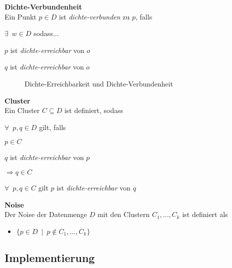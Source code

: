 \documentclass{lni}
\newcommand{\SubItem}[1]{
    {\setlength\itemindent{15pt} \item[-] #1}
}
\begin{document}

\textbf{Dichte-Verbundenheit}\\

Ein Punkt $ p \in D $ ist \textit{dichte-verbunden} zu $p$, falls
\begin{itemize}
    \item $\exists\enspace w \in D$ sodass...
        \SubItem{ $p$ ist \textit{dichte-erreichbar} von $o$}
        \SubItem{ $q$ ist \textit{dichte-erreichbar} von $o$}
\end{itemize}


\begin{figure}[hb]
    \centering
    \subfloat[]{{}}%
    \qquad
    \subfloat[]{{}}
    \caption{Dichte-Erreichbarkeit und Dichte-Verbundenheit}%
    \label{fig:2}%
\end{figure}

    
\textbf{Cluster}\\
Ein Cluster $ C \subseteq D $ ist definiert, sodass
\begin{itemize}
    \item $\forall\enspace p,q \in D$ gilt, falls
        \SubItem{$p \in C$}
        \SubItem{$q$ ist \textit{dichte-erreichbar} von $p$}
        
    $\Rightarrow q \in C$
    
    \item $\forall\enspace p,q \in C$ gilt $p$ ist \textit{dichte-erreichbar} von $q$
\end{itemize}

    
\textbf{Noise}\\
Der Noise der Datenmenge $D$ mit den Clustern $C_1,\dots,C_k$ ist definiert als
\begin{itemize}
    \item $ \{ p \in D \enspace | \enspace p \notin C_1,\dots,C_k \} $
\end{itemize}

%
%

\subsection{Implementierung}
\label{sec:impl}

\newpage
\end{document}
